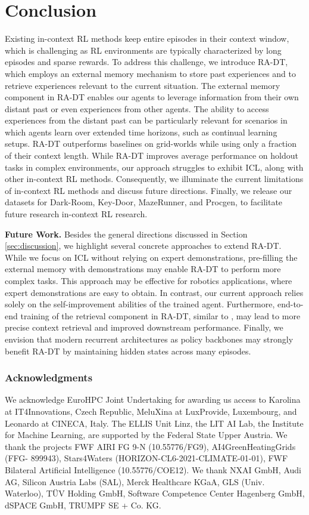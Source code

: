 \documentclass{article} %
\newcommand{\resumetocwriting}{\addtocontents{toc}{\protect\setcounter{tocdepth}{\arabic{tocdepth}}}}
\begin{document}
\section{Conclusion}\label{sec:conclusion}
Existing in-context RL methods keep entire episodes in their context window, which is challenging as RL environments are typically characterized by long episodes and sparse rewards.
To address this challenge, we introduce RA-DT, which employs an external memory mechanism to store past experiences and to retrieve experiences relevant to the current situation.
The external memory component in RA-DT enables our agents to leverage information from their own distant past or even experiences from other agents.
The ability to access experiences from the distant past can be particularly relevant for scenarios in which agents learn over extended time horizons, such as continual learning setups.
RA-DT outperforms baselines on grid-worlds while using only a fraction of their context length.
While RA-DT improves average performance on holdout tasks in complex environments, our approach struggles to exhibit ICL, along with other in-context RL methods.
Consequently, we illuminate the current limitations of in-context RL methods and discuss future directions.
Finally, we release our datasets for Dark-Room, Key-Door, MazeRunner, and Procgen, to facilitate future research in-context RL research.

\textbf{Future Work.}
Besides the general directions discussed in Section \ref{sec:discussion}, we highlight several concrete approaches to extend RA-DT. 
While we focus on ICL without relying on expert demonstrations, pre-filling the external memory with demonstrations may enable RA-DT to perform more complex tasks. 
This approach may be effective for robotics applications, where expert demonstrations are easy to obtain.
In contrast, our current approach relies solely on the self-improvement abilities of the trained agent.
Furthermore, end-to-end training of the retrieval component in RA-DT, similar to \citep{Izacard:22}, may lead to more precise context retrieval and improved downstream performance. 
Finally, we envision that modern recurrent architectures \citep{bulatov2022recurrent, gu2023mamba, beck2024xlstm} as policy backbones may strongly benefit RA-DT by maintaining hidden states across many episodes. 




\subsubsection*{Acknowledgments}
We acknowledge EuroHPC Joint Undertaking for awarding us access to Karolina at IT4Innovations, Czech Republic, MeluXina at LuxProvide, Luxembourg, and Leonardo at CINECA, Italy.
The ELLIS Unit Linz, the LIT AI Lab, the Institute for Machine Learning, are supported by the Federal State Upper Austria. We thank the projects FWF AIRI FG 9-N (10.55776/FG9), AI4GreenHeatingGrids (FFG- 899943), Stars4Waters (HORIZON-CL6-2021-CLIMATE-01-01), FWF Bilateral Artificial Intelligence (10.55776/COE12). We thank NXAI GmbH, Audi AG, Silicon Austria Labs (SAL), Merck Healthcare KGaA, GLS (Univ. Waterloo), T\"{U}V Holding GmbH, Software Competence Center Hagenberg GmbH, dSPACE GmbH, TRUMPF SE + Co. KG.
\resumetocwriting




\appendix

\end{document}

